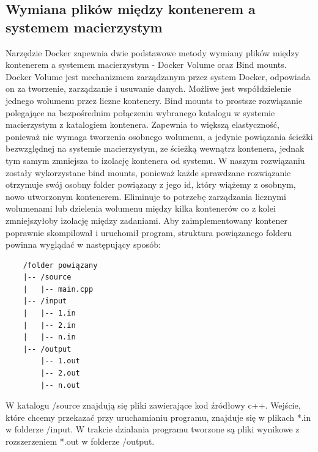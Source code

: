\subsection{Wymiana plików między kontenerem a systemem macierzystym}
Narzędzie Docker zapewnia dwie podstawowe metody wymiany plików między kontenerem a systemem macierzystym - Docker Volume\cite{dockerVolume} oraz Bind mounts\cite{dockerBindMounts}. Docker Volume jest mechanizmem zarządzanym przez system Docker, odpowiada on za tworzenie, zarządzanie i usuwanie danych. Możliwe jest współdzielenie jednego wolumenu przez liczne kontenery. Bind mounts to prostsze rozwiązanie polegające na bezpośrednim połączeniu wybranego katalogu w systemie macierzystym z katalogiem kontenera. Zapewnia to większą elastyczność, ponieważ nie wymaga tworzenia osobnego wolumenu, a jedynie powiązania ścieżki bezwzględnej na systemie macierzystym, ze ścieżką wewnątrz kontenera, jednak tym samym zmniejsza to izolację kontenera od systemu. W naszym rozwiązaniu zostały wykorzystane bind mounts, ponieważ każde sprawdzane rozwiązanie otrzymuje swój osobny folder powiązany z jego id, który wiążemy z osobnym, nowo utworzonym kontenerem. Eliminuje to potrzebę zarządzania licznymi wolumenami lub dzielenia wolumenu między kilka kontenerów co z kolei zmniejszyłoby izolację między zadaniami. Aby zaimplementowany kontener poprawnie skompilował i uruchomił program, struktura powiązanego folderu powinna wyglądać w następujący sposób:
\begin{verbatim}
    /folder powiązany
    |-- /source
    |   |-- main.cpp
    |-- /input
    |   |-- 1.in
    |   |-- 2.in
    |   |-- n.in
    |-- /output
        |-- 1.out
        |-- 2.out
        |-- n.out
\end{verbatim}
W katalogu /source znajdują się pliki zawierające kod źródłowy c++. Wejście, które chcemy przekazać przy uruchamianiu programu, znajduje się w plikach *.in w folderze /input. W trakcie działania programu tworzone są pliki wynikowe z rozszerzeniem *.out w folderze /output. 

